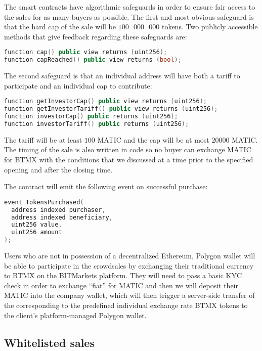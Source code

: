 \documentclass[a4paper,12pt]{article}
\begin{document}
The smart contracts have algorithmic safeguards in order to ensure fair access to
the sales for as many buyers as possible.
The first and most obvious safeguard is that the hard cap of the sale will be
$100\text{ }000\text{ }000$ tokens. Two publicly accessible methods that give feedback regarding these safeguards are:
\begin{lstlisting}[language=C++, caption=Solidity public crowdsale cap function signatures.]
function cap() public view returns (uint256);
function capReached() public view returns (bool);
\end{lstlisting}
The second safeguard is that an individual address will have
both a tariff to participate and an individual cap to contribute:
\begin{lstlisting}[language=C++, caption=Solidity public crowdsale tariff/cap function signatures.]
function getInvestorCap() public view returns (uint256);
function getInvestorTariff() public view returns (uint256);
function investorCap() public returns (uint256);
function investorTariff() public returns (uint256);
\end{lstlisting}
The tariff will be at least $100$ MATIC and the cap will be at most $20000$ MATIC.
The timing of the sale is also written in code so no buyer can exchange MATIC for BTMX
with the conditions that we discussed at a time prior to the specified opening and after the closing time.

The contract will emit the following event on successful purchase:
\begin{lstlisting}[language=C++, caption=BTMX ICO events.]
event TokensPurchased(
  address indexed purchaser,
  address indexed beneficiary,
  uint256 value,
  uint256 amount
);
\end{lstlisting}

Users who are not in possession of a decentralized Ethereum, Polygon wallet will be able to
participate in the crowdsales by exchanging their traditional currency to BTMX
on the BITMarkets platform. They will need to pass a basic KYC check in order to exchange
``fiat'' for MATIC and then we will deposit their MATIC into the company wallet, which
will then trigger a server-side transfer of the corresponding to the predefined individual
exchange rate BTMX tokens to the client's platform-managed Polygon wallet.

\subsection{Whitelisted sales}
\end{document}
